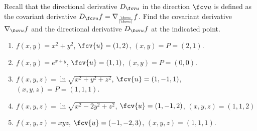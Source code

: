 Recall that the directional derivative $D_{\fcv u}$ in the direction $\fcv u$ is defined as the covariant derivative  $D_{\fcv u}f= \nabla_{\frac{\fcv u}{|\fcv u|}} f$. Find the covariant derivative $\nabla_{\fcv u} f$ and the directional derivative $D_{\fcv u} f$ at the indicated point.

\begin{enumerate}[ref={\fcProblemRef}]
\item $f(x,y) = x^2+y^2$, $\fcv{u}= (1,2)$, $(x,y)=P=(2,1)$.

\item $f(x,y) = e^{x+y}$, $\fcv{u}= (1,1)$, $(x,y)=P=(0,0)$.

\item $f(x,y, z) = \ln \sqrt{x^2+y^2+z^2}$, $\fcv{u}= (1,-1,1)$, $(x,y,z)=P=(1,1,1)$.

\item $f(x,y, z) = \ln \sqrt{x^2-2y^2+z^2}$, $\fcv{u}= (1,-1,2)$, $(x,y,z)=(1,1,2)$

\item $f(x,y,z) = xyz$, $\fcv{u}= (-1,-2,3)$, $(x,y,z)=(1,1,1)$.

\end{enumerate}